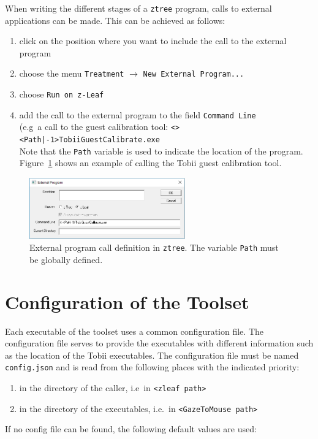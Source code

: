 \documentclass[a4paper,oneside]{book}
\begin{document}
When writing the different stages of a \texttt{ztree} program, calls to external applications can be made.
This can be achieved as follows:
\begin{enumerate}
    \item click on the position where you want to include the call to the external program
    \item choose the menu \texttt{Treatment} $\rightarrow$ \texttt{New External Program...}
    \item choose \texttt{Run on z-Leaf}
    \item add the call to the external program to the field \texttt{Command Line} \\
        (e.g~a call to the guest calibration tool: \texttt{<><Path|-1>TobiiGuestCalibrate.exe}\\
        Note that the \texttt{Path} variable is used to indicate the location of the program.
        Figure~\ref{fig.extcall} shows an example of calling the Tobii guest calibration tool.
\end{enumerate}
\begin{figure}[ht]
    \centering
    \includegraphics[width=0.6\textwidth]{ztree_extcall.png}
    \caption{External program call definition in \texttt{ztree}. The variable \texttt{Path} must be globally defined.}
    \label{fig.extcall}
\end{figure}

\section{Configuration of the Toolset}
\label{sec.config}
Each executable of the toolset uses a common configuration file.
The configuration file serves to provide the executables with different information such as the location of the Tobii executables.
The configuration file must be named \texttt{config.json} and is read from the following places with the indicated priority:
\begin{enumerate}
    \item in the directory of the caller, i.e~in \texttt{<zleaf path>}
    \item in the directory of the executables, i.e.~in \texttt{<GazeToMouse path>}
\end{enumerate}
If no config file can be found, the following default values are used:
\end{document}
